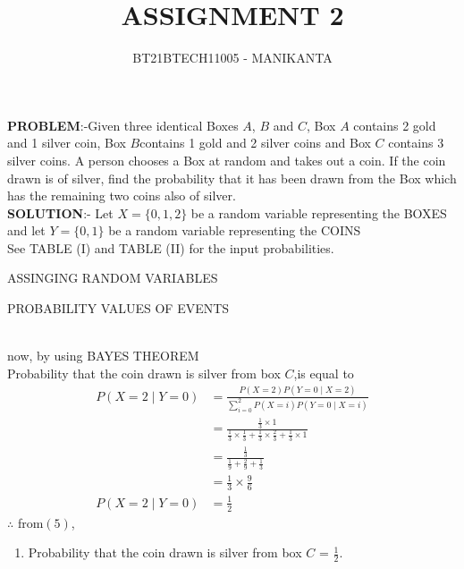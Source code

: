 \documentclass[journal,12pt,twocolumn]{IEEEtran}
\begin{document}
\vspace{3cm}
\title{ASSIGNMENT 2}
\author{BT21BTECH11005 - MANIKANTA}

\maketitle
\textbf{PROBLEM}:-Given three identical Boxes $A$, $B$ and $C$, Box $A$ contains 2 gold and 1 silver coin, Box $B $contains 1 gold and 2 silver coins and Box $C$ contains 3 silver coins. A person chooses a Box at random and takes out a coin. If the coin drawn is of silver, find the probability that it has been drawn from the Box which has the remaining two coins also of silver.\\

\textbf{SOLUTION}:-
Let $X=\{0,1,2\}$ be a random variable representing the BOXES and let $Y=\{0,1\}$ be a random variable representing the COINS \\

See TABLE (I) and TABLE (II) for the input probabilities.
\begin{table}[ht!]
\centering
 
\caption{ASSINGING RANDOM VARIABLES}
\label{Tables : TABLE}
\end{table}

 \begin{table}[ht!]
 
\caption{PROBABILITY VALUES OF EVENTS}
\label{Tables : TABLE}
\end{table}\\

now,
by using BAYES THEOREM\\
Probability that the coin drawn is silver from box $C$,is equal to
\begin{align}
P(X = 2 \mid Y = 0) &= \frac{P(X = 2)P(Y = 0 \mid X = 2)}{\sum_{i=0}^{2} P(X = i)P(Y=0 \mid X = i)}\\
 &= \frac{\frac{1}{3} \times 1}{\frac{1}{3} \times \frac{1}{3}+\frac{1}{3} \times \frac{2}{3}+\frac{1}{3} \times 1
 }\\
 &= \frac{\frac{1}{3}}{\frac{1}{9}+\frac{2}{9}+\frac{1}{3}}\\
 &= \frac{1}{3} \times \frac{9}{6}\\
 P(X = 2 \mid Y = 0) &= \frac{1}{2}
\end{align}
$\therefore$ from$(5)$,\\
\begin{enumerate}[label=]
\item Probability that the coin drawn is silver from box $C$ = $\frac{1}{2}$.
\end{enumerate}
\end{document}
